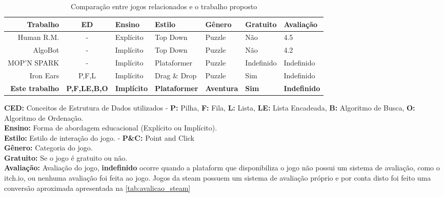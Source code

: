 \begin{table}[H]
	\caption{Comparação entre jogos relacionados e o trabalho proposto}
	\label{tab:cmp_jogos_relatos}
	\centering
	\footnotesize
	\begin{tabular}{r|clllll}
		\toprule
		\textbf{Trabalho}      & \textbf{ED}         & \textbf{Ensino}    & \textbf{Estilo}      & \textbf{Gênero}   & \textbf{Gratuito} & \textbf{Avaliação}  \\
		\midrule
		Human R.M.             & -                   & Explícito          & Top Down             & Puzzle            & Não               & 4.5                 \\
		AlgoBot                & -                   & Implícito          & Top Down             & Puzzle            & Não               & 4.2                 \\
		MOP'N SPARK            & -                   & Implícito          & Plataformer          & Puzzle            & Indefinido        & Indefinido          \\
		Iron Ears              & P,F,L               & Implícito          & Drag \& Drop         & Puzzle            & Sim               & Indefinido          \\
		\rowcolor{gray!20}
		\textbf{Este trabalho} & \textbf{P,F,LE,B,O} & \textbf{Implícito} & \textbf{Plataformer} & \textbf{Aventura} & \textbf{Sim}      & \textbf{Indefinido} \\
		\bottomrule
	\end{tabular}

	\vspace{1.25em}
	\begin{minipage}{0.8\linewidth}
		\footnotesize
		\textbf{CED:} Conceitos de Estrutura de Dados utilizados -
		\textbf{P:} Pilha, \textbf{F:} Fila, \textbf{L:} Lista, \textbf{LE:} Lista Encadeada, \textbf{B:} Algoritmo de Busca, \textbf{O:} Algoritmo de Ordenação. \\
		\textbf{Ensino:} Forma de abordagem educacional (Explícito ou Implícito). \\
		\textbf{Estilo:} Estilo de interação do jogo. - \textbf{P\&C:} Point and Click \\
		\textbf{Gênero:} Categoria do jogo. \\
		\textbf{Gratuito:} Se o jogo é gratuito ou não. \\
		\textbf{Avaliação:} Avaliação do jogo, \textbf{indefinido} ocorre quando a plataform que disponibiliza o jogo não possui um sistema de avaliação, como o itch.io, ou nenhuma avaliação foi feita ao jogo. Jogos da steam possuem um sistema de avaliação próprio e por conta disto foi feito uma conversão aproximada apresentada na \autoref{tab:avalicao_steam}
	\end{minipage}
\end{table}
